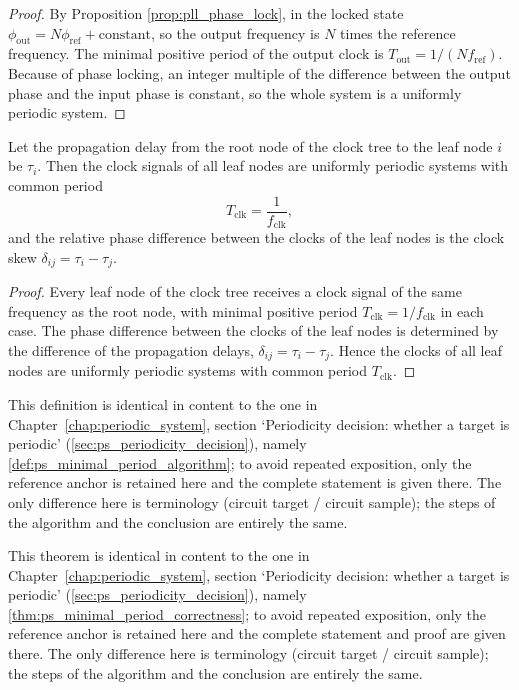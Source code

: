 \begin{proof}
By Proposition \ref{prop:pll_phase_lock}, in the locked state $\phi_{\text{out}}=N\phi_{\text{ref}}+\text{constant}$, so the output frequency is $N$ times the reference frequency. The minimal positive period of the output clock is $T_{\text{out}}=1/(Nf_{\text{ref}})$. Because of phase locking, an integer multiple of the difference between the output phase and the input phase is constant, so the whole system is a uniformly periodic system.
\end{proof}

\begin{lemma}\label{lem:clock_tree_periodic}
Let the propagation delay from the root node of the clock tree to the leaf node $i$ be $\tau_i$. Then the clock signals of all leaf nodes are uniformly periodic systems with common period
\[
T_{\text{clk}}=\frac{1}{f_{\text{clk}}},
\]
and the relative phase difference between the clocks of the leaf nodes is the clock skew $\delta_{ij}=\tau_i-\tau_j$.
\end{lemma}

\begin{proof}
Every leaf node of the clock tree receives a clock signal of the same frequency as the root node, with minimal positive period $T_{\text{clk}}=1/f_{\text{clk}}$ in each case. The phase difference between the clocks of the leaf nodes is determined by the difference of the propagation delays, $\delta_{ij}=\tau_i-\tau_j$. Hence the clocks of all leaf nodes are uniformly periodic systems with common period $T_{\text{clk}}$.
\end{proof}

\begin{definition}\label{def:circuit_minimal_period_algorithm}
This definition is identical in content to the one in Chapter~\ref{chap:periodic_system}, section `Periodicity decision: whether a target is periodic' (\cref{sec:ps_periodicity_decision}), namely \cref{def:ps_minimal_period_algorithm}; to avoid repeated exposition, only the reference anchor is retained here and the complete statement is given there. The only difference here is terminology (circuit target / circuit sample); the steps of the algorithm and the conclusion are entirely the same.
\end{definition}

\begin{theorem}\label{thm:circuit_minimal_period_correctness}
This theorem is identical in content to the one in Chapter~\ref{chap:periodic_system}, section `Periodicity decision: whether a target is periodic' (\cref{sec:ps_periodicity_decision}), namely \cref{thm:ps_minimal_period_correctness}; to avoid repeated exposition, only the reference anchor is retained here and the complete statement and proof are given there. The only difference here is terminology (circuit target / circuit sample); the steps of the algorithm and the conclusion are entirely the same.
\end{theorem}


